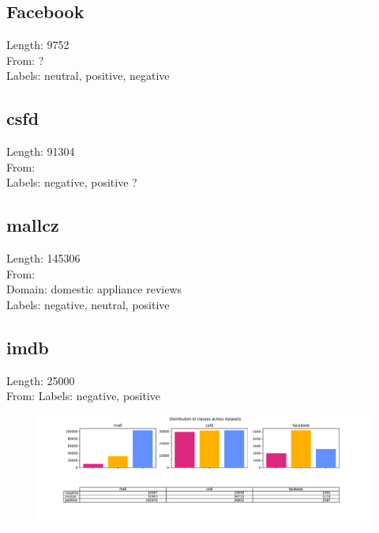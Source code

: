 \subsection{Facebook}
Length: 9752\\
From: ? \\
Labels: neutral, positive, negative

\subsection{csfd}
Length: 91304 \\
From: \\
Labels: negative, positive ? \\

\subsection{mallcz}
Length: 145306 \\
From: \\
Domain: domestic appliance reviews \\
Labels: negative, neutral, positive

\subsection{imdb}
Length: 25000 \\
From:
Labels: negative, positive



\begin{figure}[h]
\centering
\includegraphics[width=1\columnwidth]{../img/distribution}
\protect\caption{}
\label{pic:dist}
\end{figure}

